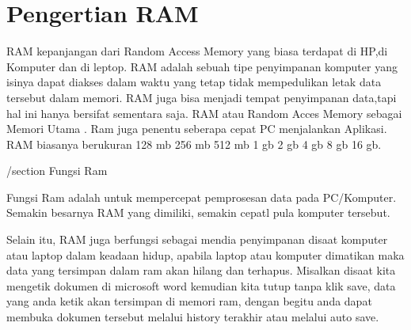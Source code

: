 \section{Pengertian RAM}
RAM kepanjangan dari Random Access Memory yang biasa terdapat di HP,di Komputer dan di leptop.
RAM adalah sebuah tipe penyimpanan komputer yang isinya dapat diakses dalam waktu yang tetap tidak mempedulikan letak data tersebut dalam memori.
RAM juga bisa menjadi tempat penyimpanan data,tapi hal ini hanya bersifat sementara saja.
RAM atau Random Acces Memory sebagai Memori Utama . Ram juga penentu seberapa cepat PC menjalankan Aplikasi.
RAM biasanya berukuran 128 mb 256 mb 512 mb 1 gb 2 gb 4 gb 8 gb 16 gb.

/section {Fungsi Ram}

Fungsi Ram adalah untuk mempercepat pemprosesan data pada PC/Komputer. 
Semakin besarnya RAM yang dimiliki, 
semakin cepatl pula komputer tersebut.

Selain itu, RAM juga berfungsi sebagai mendia penyimpanan disaat komputer atau laptop dalam keadaan hidup, 
apabila laptop atau komputer dimatikan maka data yang tersimpan dalam ram akan hilang dan terhapus. 
Misalkan disaat kita mengetik dokumen di microsoft word kemudian kita tutup tanpa klik save, 
data yang anda ketik akan tersimpan di memori ram, dengan begitu anda dapat membuka dokumen tersebut melalui history terakhir atau melalui auto save.